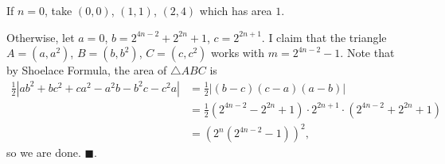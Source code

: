 If $n=0$, take $\left(0,0\right)$, $\left(1,1\right)$, $\left(2,4\right)$ which has area $1$.

Otherwise, let $a=0$, $b=2^{4n-2}+2^{2n}+1$, $c=2^{2n+1}$. I claim that the triangle $A=\left(a,a^2\right)$, $B=\left(b,b^2\right)$, $C=\left(c,c^2\right)$ works with $m=2^{4n-2}-1$. Note that by Shoelace Formula, the area of $\triangle{ABC}$ is \begin{align*}\frac{1}{2}\left|ab^2+bc^2+ca^2-a^2b-b^2c-c^2a\right|&=\frac{1}{2}\left|\left(b-c\right)\left(c-a\right)\left(a-b\right)\right|\\&=\frac{1}{2}\left(2^{4n-2}-2^{2n}+1\right)\cdot2^{2n+1}\cdot\left(2^{4n-2}+2^{2n}+1\right)\\&=\left(2^n\left(2^{4n-2}-1\right)\right)^2,\end{align*} so we are done. $\blacksquare$.